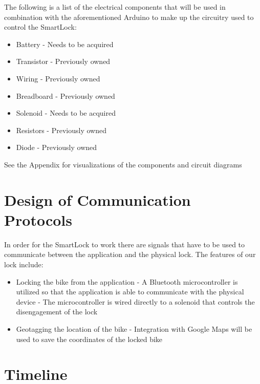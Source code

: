 \documentclass[12pt, titlepage]{article}
\begin{document}
The following is a list of the electrical components that will be used in combination with the aforementioned Arduino to make up the circuitry used to control the SmartLock:
\begin{itemize}
\item Battery
\subitem - Needs to be acquired
\item Transistor
\subitem - Previously owned
\item Wiring
\subitem - Previously owned
\item Breadboard
\subitem - Previously owned
\item Solenoid
\subitem - Needs to be acquired
\item Resistors
\subitem - Previously owned
\item Diode
\subitem - Previously owned
\end{itemize}

See the Appendix for visualizations of the components and circuit diagrams


\section{Design of Communication Protocols}

In order for the SmartLock to work there are signals that have to be used to communicate between the application and the physical lock. 
The features of our lock include: 
\begin{itemize}
\item Locking the bike from the application
\subitem - A Bluetooth microcontroller is utilized so that the application is able to communicate with the physical device
\subitem - The microcontroller is wired directly to a solenoid that controls the disengagement of the lock
\item Geotagging the location of the bike
\subitem - Integration with Google Maps will be used to save the coordinates of the locked bike
\end{itemize}


\section{Timeline}
\end{document}
